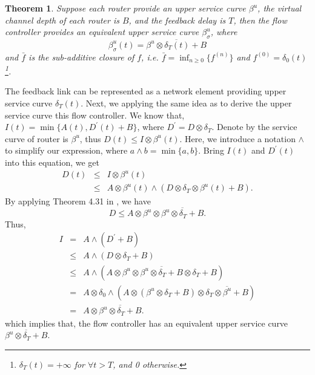 \documentclass[10pt,journal]{IEEEtran}
\newtheorem{theorem}{Theorem}
\begin{document}
\begin{theorem}\label{credit}
Suppose each router provide an upper service curve $\beta^u$, the virtual channel depth of each router is $B$, and the feedback delay is $T$, then the flow controller provides an equivalent upper service curve $\beta^{u}_\sigma$, where $$\beta^{u}_\sigma(t)=\overline{\beta^u\otimes\delta_T(t)+B}$$
and $\bar{f}$ is the sub-additive closure of $f$, i.e. $\bar{f}=\inf_{n\geq 0}\{f^{(n)}\}$ and $f^{(0)}=\delta_0(t)$\footnote{$\delta_T(t)=+\infty$ for $\forall t>T$, and 0 otherwise.}.
\end{theorem}
\begin{IEEEproof}
The feedback link can be represented as a network element providing upper service curve $\delta_T(t)$. Next, we applying the same idea as \cite{QLDD09FC} to derive the upper service curve this flow controller. We know that, $I(t)=\min\{A(t),D^\prime(t)+B\}$, where $D^\prime=D\otimes\delta_T$. Denote by the service curve of router is $\beta^u$, thus $D(t)\leq I\otimes \beta^u(t)$. Here, we introduce a notation $\wedge$ to simplify our expression, where $a\wedge b=\min\{a,b\}$. Bring $I(t)$ and $D^\prime(t)$ into this equation, we get
\begin{eqnarray*}
D(t)&\leq& I\otimes \beta^u(t)\\
&\leq& A\otimes \beta^u(t)\wedge(D\otimes\delta_T\otimes \beta^u(t)+B).
\end{eqnarray*}
By applying Theorem 4.31 in \cite{Boudec2001Network}, we have
$$D\leq A\otimes \beta^u\otimes\overline{\beta^u\otimes\delta_T+B}.$$
Thus,
\begin{eqnarray*}
  I&=& A\wedge(D^\prime+B)\\
  &\leq& A\wedge(D\otimes\delta_T+B)\\
  &\leq& A\wedge(A\otimes \beta^u\otimes\overline{\beta^u\otimes\delta_T+B}\otimes\delta_T+B)\\
  &=&A\otimes \delta_0\wedge(A\otimes (\beta^u\otimes\delta_T+B)\otimes\overline{\delta_T\otimes\beta^u+B})\\
  &=& A\otimes\overline{\beta^u\otimes\delta_T+B}.
\end{eqnarray*}
which implies that, the flow controller has an equivalent upper service curve $\overline{\beta^u\otimes\delta_T+B}$.
\end{IEEEproof}
\end{document}
